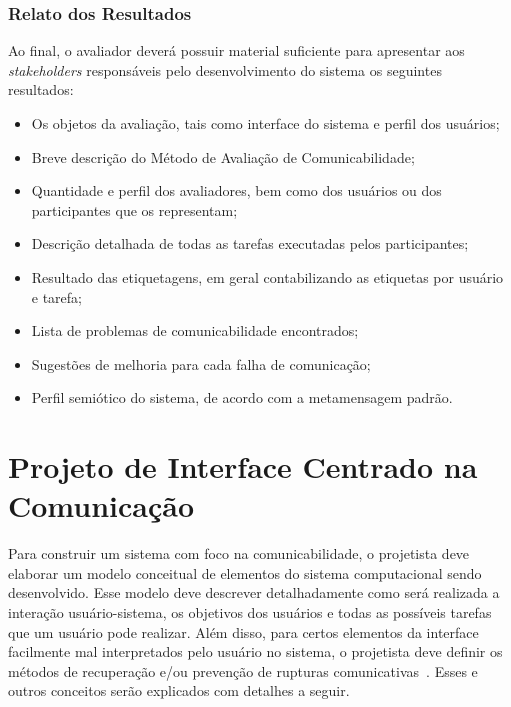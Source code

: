 \subsubsection{Relato dos Resultados}

\indent Ao final, o avaliador deverá possuir material suficiente para apresentar aos \textit{stakeholders} responsáveis pelo desenvolvimento do sistema os seguintes resultados:

\begin{itemize}
\item Os objetos da avaliação, tais como interface do sistema e perfil dos usuários;
\item Breve descrição do Método de Avaliação de Comunicabilidade;
\item Quantidade e perfil dos avaliadores, bem como dos usuários ou dos participantes que os representam;
\item Descrição detalhada de todas as tarefas executadas pelos participantes;
\item Resultado das etiquetagens, em geral contabilizando as etiquetas por usuário e tarefa;
\item Lista de problemas de comunicabilidade encontrados;
\item Sugestões de melhoria para cada falha de comunicação;
\item Perfil semiótico do sistema, de acordo com a metamensagem padrão.
\end{itemize}










\section{Projeto de Interface Centrado na Comunicação}

\indent Para construir um sistema com foco na comunicabilidade, o projetista deve elaborar um modelo conceitual de elementos do sistema computacional sendo desenvolvido. Esse modelo deve descrever detalhadamente como será realizada a interação usuário-sistema, os objetivos dos usuários e todas as possíveis tarefas que um usuário pode realizar. Além disso, para certos elementos da interface facilmente mal interpretados pelo usuário no sistema, o projetista deve definir os métodos de recuperação e/ou prevenção de rupturas comunicativas~\cite{IHCbook}. Esses e outros conceitos serão explicados com detalhes a seguir.

